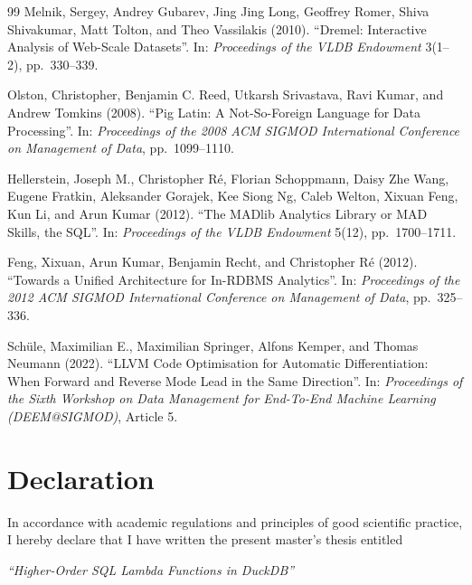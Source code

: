 \documentclass[12pt]{report}
\begin{document}
\begin{thebibliography}{99}
Melnik, Sergey, Andrey Gubarev,
Jing Jing Long, Geoffrey Romer,
Shiva Shivakumar, Matt Tolton,
and Theo Vassilakis (2010).
``Dremel: Interactive Analysis of Web-Scale Datasets''.
In: \textit{Proceedings of the VLDB Endowment} 3(1--2),
pp.~330--339.

Olston, Christopher, Benjamin C. Reed,
Utkarsh Srivastava, Ravi Kumar,
and Andrew Tomkins (2008).
``Pig Latin: A Not-So-Foreign Language for Data Processing''.
In: \textit{Proceedings of the 2008 ACM SIGMOD International Conference on Management of Data},
pp.~1099--1110.

Hellerstein, Joseph M., Christopher R\'e, Florian Schoppmann,
Daisy Zhe Wang, Eugene Fratkin, Aleksander Gorajek,
Kee Siong Ng, Caleb Welton, Xixuan Feng,
Kun Li, and Arun Kumar (2012).
``The MADlib Analytics Library or MAD Skills, the SQL''.
In: \textit{Proceedings of the VLDB Endowment} 5(12),
pp.~1700--1711.

Feng, Xixuan, Arun Kumar, Benjamin Recht, and Christopher R\'e (2012).
``Towards a Unified Architecture for In-RDBMS Analytics''.
In: \textit{Proceedings of the 2012 ACM SIGMOD International Conference on Management of Data},
pp.~325--336.

Sch{\"u}le, Maximilian E., Maximilian Springer,
Alfons Kemper, and Thomas Neumann (2022).
``LLVM Code Optimisation for Automatic Differentiation:
When Forward and Reverse Mode Lead in the Same Direction''.
In: \textit{Proceedings of the Sixth Workshop on Data Management
for End-To-End Machine Learning (DEEM@SIGMOD)},
Article 5.

\end{thebibliography}


\newpage

\chapter*{Declaration}

In accordance with academic regulations and principles of good scientific
practice, I hereby declare that I have written the present master's thesis
entitled

\begin{center}
\textit{``Higher-Order SQL Lambda Functions in DuckDB''}
\end{center}
\end{document}
